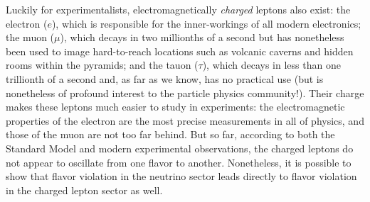 Luckily for experimentalists, electromagnetically {\it charged} leptons also exist: the electron ($e$), which is responsible for the inner-workings of all modern electronics; the muon ($\mu$), which decays in two millionths of a second but has nonetheless been used to image hard-to-reach locations such as volcanic caverns and hidden rooms within the pyramids; and the tauon ($\tau$), which decays in less than one trillionth of a second and, as far as we know, has no practical use (but is nonetheless of profound interest to the particle physics community!). Their charge makes these leptons much easier to study in experiments: the electromagnetic properties of the electron are the most precise measurements in all of physics, and those of the muon are not too far behind. But so far, according to both the Standard Model and modern experimental observations, the charged leptons do not appear to oscillate from one flavor to another. Nonetheless, it is possible to show that flavor violation in the neutrino sector leads directly to flavor violation in the charged lepton sector as well.

